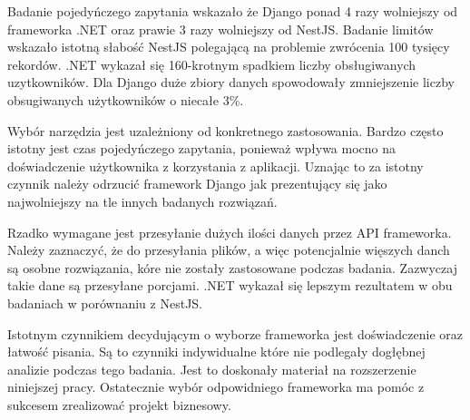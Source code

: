 Badanie pojedyńczego zapytania wskazało że Django ponad 4 razy wolniejszy od frameworka .NET oraz prawie 3 razy wolniejszy od NestJS.
Badanie limitów wskazało istotną słabość NestJS polegającą na problemie zwrócenia 100 tysięcy rekordów. .NET wykazał się 160-krotnym spadkiem liczby obsługiwanych uzytkowników.
Dla Django duże zbiory danych spowodowały zmniejszenie liczby obsugiwanych użytkowników o niecałe 3\%.

Wybór narzędzia jest uzależniony od konkretnego zastosowania.
Bardzo często istotny jest czas pojedyńczego zapytania, ponieważ wpływa mocno na doświadczenie użytkownika z korzystania z aplikacji.
Uznając to za istotny czynnik należy odrzucić framework Django jak prezentujący się jako najwolniejszy na tle innych badanych rozwiązań.

Rzadko wymagane jest przesyłanie dużych ilości danych przez API frameworka.
Należy zaznaczyć, że do przesyłania plików, a więc potencjalnie więszych danch są osobne rozwiązania, kóre nie zostały zastosowane podczas badania.
Zazwyczaj takie dane są przesyłane porcjami.
.NET wykazał się lepszym rezultatem w obu badaniach w porównaniu z NestJS.

Istotnym czynnikiem decydującym o wyborze frameworka jest doświadczenie oraz łatwość pisania.
Są to czynniki indywidualne które nie podlegały dogłębnej analizie podczas tego badania.
Jest to doskonały materiał na rozszerzenie niniejszej pracy.
Ostatecznie wybór odpowidniego frameworka ma pomóc z sukcesem zrealizować projekt biznesowy.